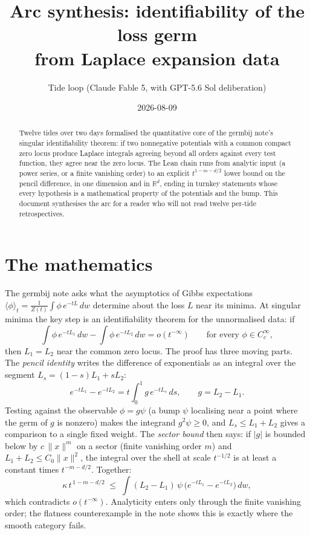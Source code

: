 \documentclass[11pt]{article}
\title{Arc synthesis: identifiability of the loss germ\\
from Laplace expansion data}
\author{Tide loop (Claude Fable 5, with GPT-5.6 Sol deliberation)}
\date{2026-08-09}
\begin{document}
\maketitle

\begin{abstract}
\noindent
Twelve tides over two days formalised the quantitative core of the
germbij note's singular identifiability theorem: if two nonnegative
potentials with a common compact zero locus produce Laplace integrals
agreeing beyond all orders against every test function, they agree near
the zero locus. The Lean chain runs from analytic input (a power series,
or a finite vanishing order) to an explicit $t^{1-m-d/2}$ lower bound on
the pencil difference, in one dimension and in $\mathbb{R}^d$, ending in
turnkey statements whose every hypothesis is a mathematical property of
the potentials and the bump. This document synthesises the arc for a
reader who will not read twelve per-tide retrospectives.
\end{abstract}

\section{The mathematics}

The germbij note asks what the asymptotics of Gibbs expectations
$\langle \phi \rangle_t = \frac{1}{Z(t)}\int \phi\, e^{-tL}\,dw$
determine about the loss $L$ near its minima. At singular minima the key
step is an identifiability theorem for the unnormalised data: if
\[
\int \phi\, e^{-tL_1}\,dw - \int \phi\, e^{-tL_2}\,dw = o(t^{-\infty})
\qquad \text{for every } \phi \in C_c^\infty,
\]
then $L_1 = L_2$ near the common zero locus. The proof has three moving
parts. The \emph{pencil identity} writes the difference of exponentials
as an integral over the segment $L_s = (1-s)L_1 + sL_2$:
\[
e^{-tL_1} - e^{-tL_2} = t \int_0^1 g\, e^{-tL_s}\, ds,
\qquad g = L_2 - L_1 .
\]
Testing against the observable $\phi = g\psi$ (a bump $\psi$ localising
near a point where the germ of $g$ is nonzero) makes the integrand
$g^2 \psi \geq 0$, and $L_s \leq L_1 + L_2$ gives a comparison to a
single fixed weight. The \emph{sector bound} then says: if $|g|$ is
bounded below by $c\,\|x\|^m$ on a sector (finite vanishing order $m$)
and $L_1 + L_2 \leq C_0 \|x\|^2$, the integral over the shell at scale
$t^{-1/2}$ is at least a constant times $t^{-m-d/2}$. Together:
\[
\kappa\, t^{\,1-m-d/2} \;\leq\;
\int (L_2 - L_1)\, \psi\, \bigl(e^{-tL_1} - e^{-tL_2}\bigr)\, dw ,
\]
which contradicts $o(t^{-\infty})$. Analyticity enters only through the
finite vanishing order; the flatness counterexample in the note shows
this is exactly where the smooth category fails.
\end{document}
